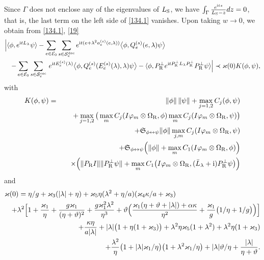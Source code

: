 \documentclass[letterpaper,onecolumn,11pt,accepted=2021-12-09]{quantumarticle}
\numberwithin{equation}{section}
\newcommand{\sym}{ {\mathfrak S}_{\phi\leftrightarrow\psi}}
\newcommand{\aes}{a_e^{(s)}}
\newcommand{\Qes}{Q_e^{(s)}}
\newcommand{\Ees}{E_e^{(s)}(\lambda)}
\renewcommand{\r}{{\rm R}}
\newcommand{\s}{{\rm S}}
\renewcommand{\i}{{\rm i}}
\begin{document}
Since $\Gamma$ does not enclose any of the eigenvalues of $L_\s$, we have $\int_{\Gamma} \frac{e^{\i tz}}{L_\s-z}dz =0$, that is, the last term on the left side of \eqref{134.1} vanishes. Upon taking $w\rightarrow 0$, we obtain from \eqref{134.1}, \eqref{19}
\begin{eqnarray}
	\lefteqn{
\Big| \langle\phi, e^{\i tL_\lambda}\psi\rangle  - \sum_{e\in{\mathcal E}_0}\sum_{s\in{\mathcal S}_e^{\rm dec}}e^{\i t (e+\lambda^2 \aes(e,\lambda))} \big\langle\phi, \Qes(e,\lambda)\psi\big\rangle}	\label{134.2}\\ &&-\sum_{e\in{\mathcal E}_0}\sum_{s\in{\mathcal S}_e^{\rm osc}}  \, e^{\i t \Ees}\big\langle \phi, \Qes(\Ees,\lambda)\psi\big\rangle -\langle \phi, P^\perp_\r e^{\i t P^\perp_\r L_\lambda P^\perp_\r} P^\perp_\r \psi\rangle \Big| \prec \varkappa(0)K(\phi,\psi),
\nonumber
\end{eqnarray}
with
\begin{eqnarray}
K(\phi,\psi) &=& \|\phi\|\,\|\psi\| + \max_{j=1,2} C_j(\phi,\psi)\nonumber \\
&& +\max_{j=1,2} \big( \max_m C_j(I\varphi_m\otimes\Omega_\r,\phi) \max_m C_j(I\varphi_m\otimes\Omega_\r,\psi)\big)\nonumber\\
&&+  \sym \|\phi\| \max_{j,m}C_j(I\varphi_m\otimes\Omega_\r, \psi)\nonumber\\
&&  +  \sym \Big( \|\phi\| +\max_m C_1(I\varphi_m\otimes\Omega_\r, \phi)\Big)\nonumber\\
&&\quad \times \Big(  \|P_\r I\|  \|P^\perp_\r\psi\|+ \max_m C_1\big(I\varphi_m\otimes\Omega_\r,(\bar L_\lambda+\i)P^\perp_\r\psi\big) \Big)
\label{137}
\end{eqnarray}
and
\begin{eqnarray}
\lefteqn{
\varkappa(0) =	
\eta/g+ \varkappa_3 (|\lambda|+\eta) +\varkappa_5\eta(\lambda^2+\eta/a)(\varkappa_4\kappa/a+\varkappa_3)  }  \nonumber\\
&&+\lambda^2 \Big[ 1+\frac{\varkappa_1}{\eta}+ \frac{g\varkappa_1}{(\eta+\vartheta)^2} + \frac{g\varkappa^2_1\lambda^2}{\eta^3} +\vartheta \Big(\frac{\varkappa_1(\eta+\vartheta+|\lambda|)+\alpha\kappa}{\eta^2} +\frac{\varkappa_1}{g}\big(1/\eta +1/g\big)\Big)
\Big] \nonumber\\
&&+ \frac{\kappa\eta}{a|\lambda|} +|\lambda|\big(1+\eta(1+\varkappa_3)\big) +\lambda^2\eta\varkappa_5 (1+\lambda^2)  +\lambda^2\eta(1+\varkappa_3)\nonumber\\
&&+ \frac{\lambda^2}{\eta} \big( 1+|\lambda|\varkappa_1/\eta\big) \big(1+ \lambda^2\varkappa_1/\eta\big) +|\lambda|\vartheta/\eta + \frac{|\lambda|}{\eta+\vartheta}.
\label{117.1}
\end{eqnarray}
\end{document}
